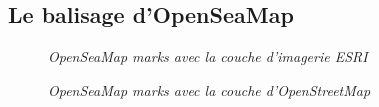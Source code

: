 \subsection{Le balisage d'OpenSeaMap}
\begin{center}
\begin{figure}[ht]
\caption{\label{equiProj}\textit{OpenSeaMap marks avec la couche d'imagerie ESRI}}
\end{figure}
\end{center}
\begin{center}
\begin{figure}[ht]
\caption{\label{equiProj}\textit{OpenSeaMap marks avec la couche d'OpenStreetMap}}
\end{figure}
\end{center}

